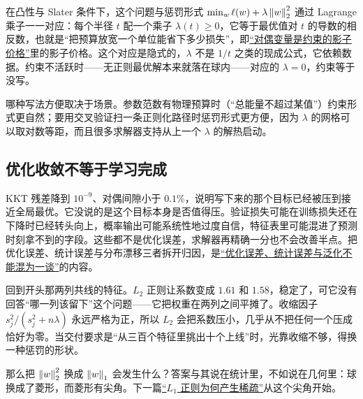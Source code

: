 在凸性与 Slater 条件下，这个问题与惩罚形式 \(\min_w \ell(w)+\lambda\left\lVert w\right\rVert_2^2\) 通过 Lagrange 乘子一一对应：每个半径 \(t\) 配一个乘子 \(\lambda(t)\ge0\)，它等于最优值对 \(t\) 的导数的相反数，也就是``把预算放宽一个单位能省下多少损失''，即\hyperref[sec:09-Convex-Optimization/05-Duality/04]{``对偶变量是约束的影子价格''}里的影子价格。这个对应是隐式的，\(\lambda\) 不是 \(1/t\) 之类的现成公式，它依赖数据。约束不活跃时——无正则最优解本来就落在球内——对应的 \(\lambda=0\)，约束等于没写。

哪种写法方便取决于场景。参数范数有物理预算时（``总能量不超过某值''）约束形式更自然；要用交叉验证扫一条正则化路径时惩罚形式更方便，因为 \(\lambda\) 的网格可以取对数等距，而且很多求解器支持从上一个 \(\lambda\) 的解热启动。

\subsection{优化收敛不等于学习完成}

KKT 残差降到 \(10^{-9}\)、对偶间隙小于 \(0.1\%\)，说明写下来的那个目标已经被压到接近全局最优。它没说的是这个目标本身是否值得压。验证损失可能在训练损失还在下降时已经转头向上，概率输出可能系统性地过度自信，特征表里可能混进了预测时刻拿不到的字段。这些都不是优化误差，求解器再精确一分也不会改善半点。把优化误差、统计误差与分布漂移三者拆开归因，是\hyperref[sec:09-Convex-Optimization/08-Nonconvex-and-Stochastic-Optimization/06]{``优化误差、统计误差与泛化不能混为一谈''}的内容。

回到开头那两列共线的特征。\(L_2\) 正则让系数变成 \(1.61\) 和 \(1.58\)，稳定了，可它没有回答``哪一列该留下''这个问题——它把权重在两列之间平摊了。收缩因子 \(s_j^2/(s_j^2+n\lambda)\) 永远严格为正，所以 \(L_2\) 会把系数压小，几乎从不把任何一个压成恰好为零。当交付要求是``从三百个特征里挑出十个上线''时，光靠收缩不够，得换一种惩罚的形状。

那么把 \(\left\lVert w\right\rVert_2^2\) 换成 \(\left\lVert w\right\rVert_1\) 会发生什么？答案与其说在统计里，不如说在几何里：球换成了菱形，而菱形有尖角。下一篇\hyperref[sec:09-Convex-Optimization/07-Applications/02]{``\(L_1\) 正则为何产生稀疏''}从这个尖角开始。
